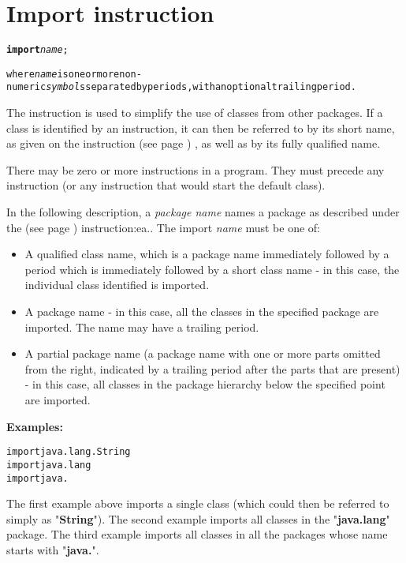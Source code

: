 \chapter{Import instruction}\label{refimport}
\begin{shaded}
\begin{alltt}
\textbf{import} \emph{name};

where \emph{name} is one or more non-numeric \emph{symbol}s separated by periods, with an optional trailing period.
\end{alltt}
\end{shaded}
 
The  instruction is used to simplify the use of
classes from other packages.
If a class is identified by an  instruction, it can then
be referred to by its short name, as given on the
  instruction (see page \pageref{refclass}) , as well as by its fully
qualified name.
 
There may be zero or more  instructions in a program.
They must precede any  instruction (or any instruction
that would start the default class).
 
In the following description, a \emph{package name} names a package
as described under the   (see page \pageref{refpackage}) 
instruction:ea..
The import \emph{name} must be one of:
\begin{itemize}
\item A qualified class name, which is a package name immediately followed
by a period which is immediately followed by a short class name -
in this case, the individual class identified is imported.
\item A package name - in this case, all the classes in the specified
package are imported.  The name may have a trailing period.
\item A partial package name (a package name with one or more parts
omitted from the right, indicated by a trailing period after the parts
that are present) - in this case, all classes in the package hierarchy
below the specified point are imported.
\end{itemize}
 \textbf{Examples:}
\begin{alltt}
import java.lang.String
import java.lang
import java.
\end{alltt}
The first example above imports a single class (which could then be
referred to simply as "\textbf{String}").
The second example imports all classes in the
"\textbf{java.lang}" package.
The third example imports all classes in all the packages whose name
starts with "\textbf{java.}".
 
